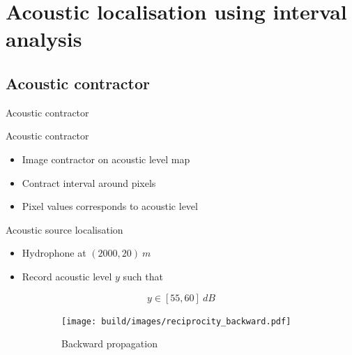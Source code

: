 \documentclass[9pt, xcolor={usenames, dvipsnames}]{beamer}
\begin{document}
		\section{Acoustic localisation using interval analysis}

			\subsection{Acoustic contractor}

			\begin{frame}{Acoustic contractor}
				\centering
				\begin{minipage}[c]{0.6\textwidth}
					\begin{block}{Acoustic contractor}
						\begin{itemize}
							\item Image contractor on acoustic level map
							\item Contract interval around pixels
							\item Pixel values corresponds to acoustic level
						\end{itemize}
					\end{block}
					\begin{exampleblock}{Acoustic source localisation}
						\begin{itemize}
							\item Hydrophone at $(2000, 20)\ m$
							\item Record acoustic level $y$ such that
						\end{itemize}
						\begin{equation}
							y \in [55, 60]\ dB
						\end{equation}
					\end{exampleblock}
				\end{minipage}
				\hfill
				\begin{minipage}[c]{0.36\textwidth}
					\begin{figure}[!htb]
						\begin{subfigure}[!htb]{\textwidth}
							\texttt{[image: build/images/reciprocity\_backward.pdf]}
							\caption{Backward propagation}
						\end{subfigure}
						\begin{subfigure}[!htb]{\textwidth}

\end{subfigure}
\end{figure}
\end{minipage}
\end{frame}
\end{document}
